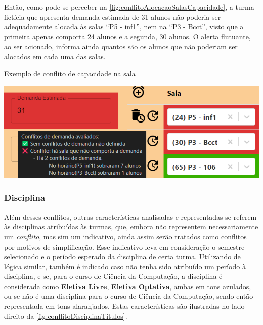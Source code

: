 Então, como pode-se perceber na \autoref{fig:conflitoAlocacaoSalasCapacidade}, a turma fictícia que apresenta demanda estimada de 31 alunos não poderia ser adequadamente alocada às salas ``P5 - inf1'', nem na ``P3 - Bcct'', visto que a primeira apenas comporta 24 alunos e a segunda, 30 alunos. O alerta flutuante, ao ser acionado, informa ainda quantos são os alunos que não poderiam ser alocados em cada uma das salas.

\begin{MyCenteredFigure}
  \caption{Exemplo de conflito de capacidade na sala}
  \label{fig:conflitoAlocacaoSalasCapacidade}
  \includegraphics[width=\textwidth]{files/img/2.02!5-desenvolvimento/2.02!5.1.5-conflitos/Demanda X Capacidade}
\end{MyCenteredFigure}

\subsubsection{Disciplina} \label{sssec:Disciplina}

Além desses conflitos, outras características analisadas e representadas se referem às disciplinas atribuídas às turmas, que, embora não representem necessariamente um \textit{conflito}, mas sim um indicativo, ainda assim serão tratados como conflitos por motivos de simplificação. Esse indicativo leva em consideração o semestre selecionado e o período esperado da disciplina de certa turma. Utilizando de lógica similar, também é indicado caso não tenha sido atribuído um período à disciplina, e se, para o curso de Ciência da Computação, a disciplina é considerada como \textbf{Eletiva Livre}, \textbf{Eletiva Optativa}, ambas em tons azulados, ou se não é uma disciplina para o curso de Ciência da Computação, sendo então representada em tons alaranjados. Estas características são ilustradas no lado direito da \autoref{fig:conflitoDisciplinaTitulos}.


